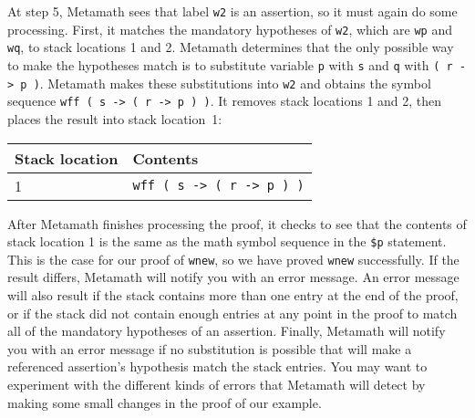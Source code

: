 At step 5, Metamath sees that label \texttt{w2} is an assertion, so it must again
do some processing.  First, it matches the mandatory hypotheses of \texttt{w2},
which are \texttt{wp} and \texttt{wq}, to stack locations 1 and 2.
Metamath determines that the only possible way to make the
hypotheses match is to substitute variable \texttt{p} with \texttt{s} and \texttt{q} with
\texttt{( r -> p )}.  Metamath makes these substitutions into \texttt{w2} and obtains
the symbol
sequence \texttt{wff ( s -> ( r -> p ) )}.  It removes stack
locations 1 and 2, then places the result into stack location~1:

\begin{center}\begin{tabular}{|l|l|}\hline
{Stack location} & {Contents} \\ \hline \hline
1 & \texttt{wff ( s -> ( r -> p ) )} \\ \hline
\end{tabular}\end{center}

After Metamath finishes processing the proof, it checks to see that the
contents of stack location 1 is the same as the math symbol sequence in the
\texttt{\$p} statement.  This is the case for our
proof of \texttt{wnew}, so we have proved \texttt{wnew} successfully.  If the result
differs, Metamath will notify you with an error message.  An error message
will also result if the stack contains more than one entry at the end of the
proof, or if the stack did not contain enough entries at any point in the
proof to match all of the mandatory hypotheses of
an assertion.  Finally, Metamath will notify you with an error message if no
substitution is possible that will make a referenced assertion's hypothesis
match the
stack entries.  You may want to experiment with the different kinds of errors
that Metamath will detect by making some small changes in the proof of our
example.

